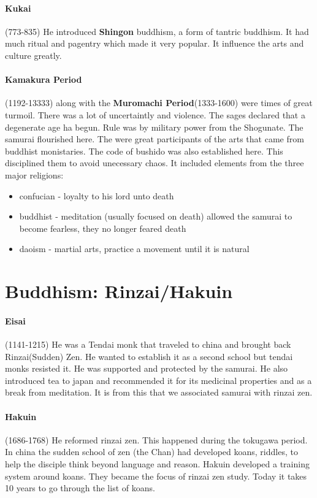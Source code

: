 \documentclass{article}
\begin{document}
\paragraph{Kukai}
\label{par:kukai}
(773-835) He introduced \textbf{Shingon} buddhism, a form of tantric buddhism. It had much ritual and pagentry which made it very popular. It influence the arts and culture greatly.

\paragraph{Kamakura Period}
\label{par:kamakura_period}
(1192-13333) along with the \textbf{Muromachi Period}(1333-1600) were times of great turmoil. There was a lot of uncertaintly and violence. The sages declared that a degenerate age ha begun. Rule was by military power from the Shogunate. The samurai flourished here. The were great participants of the arts that came from buddhist monistaries. The code of bushido was also established here. This disciplined them to avoid unecessary chaos. It included elements from the three major religions:
\begin{itemize}
 	\item confucian - loyalty to his lord unto death
 	\item buddhist - meditation (usually focused on death) allowed the samurai to become fearless, they no longer feared death
 	\item daoism - martial arts, practice a movement until it is natural
 \end{itemize}

\section*{Buddhism: Rinzai/Hakuin}
\label{sec:buddhism_rinzai_hakuin}
\paragraph{Eisai}
\label{par:eisai}
(1141-1215) He was a Tendai monk that traveled to china and brought back Rinzai(Sudden) Zen. He wanted to establish it as a second school but tendai monks resisted it. He was supported and protected by the samurai. He also introduced tea to japan and recommended it for its medicinal properties and as a break from meditation. It is from this that we associated samurai with rinzai zen.

\paragraph{Hakuin}
\label{par:hakuin}
(1686-1768) He reformed rinzai zen. This happened during the tokugawa period. In china the sudden school of zen (the Chan) had developed koans, riddles, to help the disciple think beyond language and reason. Hakuin developed a training system around koans. They became the focus of rinzai zen study. Today it takes 10 years to go through the list of koans.
\end{document}
